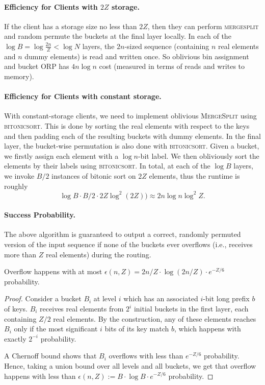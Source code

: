 \paragraph{Efficiency for Clients with $2Z$ storage.}

If the client has a storage size no less than $2Z$, then they can perform \textsc{mergesplit} and random permute the buckets at the final layer locally. In each of the $\log B = \log \frac{2n}{Z} < \log N$ layers, the $2n$-sized sequence (containing $n$ real elements and $n$ dummy elements) is read  and written once. So oblivious bin assignment and bucket ORP has $4n\log n$ cost (measured
in terms of reads and writes to memory). 

\paragraph{Efficiency for Clients with constant storage.}

With constant-storage clients, we need to implement oblivious \textsc{MergeSplit} using \textsc{bitonicsort}. This is done by sorting the real elements with respect to the keys and then padding each of the resulting buckets with dummy elements. In the final layer, the bucket-wise permutation is also done with \textsc{bitonicsort}. Given a bucket, we firstly assign  each  element  with a  $\log n$-bit label. We then obliviously  sort  the  elements  by  their  labels using  \textsc{bitonicsort}.  In total, at each of the $\log B$ layers, we invoke $B/2$ instances of bitonic sort on $2Z$ elements, thus the  runtime  is  roughly  \[\log B\cdot B/2\cdot 2Z\log^2(2Z))\approx 2n\log n\log^2Z.\]

\paragraph{Success Probability.} The above algorithm is guaranteed to output a correct, randomly permuted version of the input sequence if none of the buckets ever overflows (i.e., receives more than $Z$ real elements) during the routing.

\begin{lemma}
    Overflow happens  with  at most $\epsilon(n,Z) =2n/Z\cdot\log(2n/Z)\cdot e^{-Z/6}$ probability.
\end{lemma}

\begin{proof}
    Consider a bucket $B_i$ at level $i$ which has an associated $i$-bit long prefix $b$ of keys. $B_i$ receives real  elements from $2^i$ initial buckets in the first layer,  each  containing $Z/2$ real  elements. By the construction, any of these elements reaches $B_i$ only if the most significant $i$ bits  of its  key match $b$, which happens with exactly $2^{-i}$ probability. 
    
    A Chernoff bound  shows that $B_i$ overflows  with  less  than $e^{-Z/6}$ probability. Hence, taking a union  bound  over  all  levels and all buckets, we get that overflow happens with less than $\epsilon(n,Z) := B\cdot \log B\cdot e^{-Z/6}$ probability.
\end{proof}



